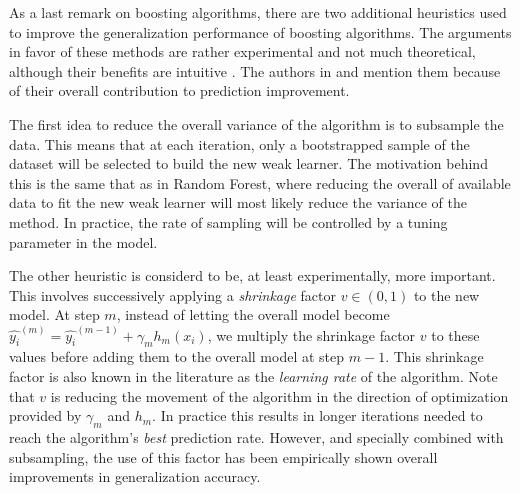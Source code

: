 \documentclass{article}%
\theoremstyle{definition}
\begin{document}
As a last remark on boosting algorithms, there are two additional heuristics used to improve the generalization performance of boosting algorithms. The arguments in favor of these methods are rather experimental and not much theoretical, although their benefits are intuitive . The authors in \cite{hastie-elemstatslearn} and \cite{bishop - patternRecognition} mention them because of their overall contribution to prediction improvement.

The first idea to reduce the overall variance of the algorithm is to subsample the data. This means that at each iteration, only a bootstrapped sample of the dataset will be selected to build the new weak learner. The motivation behind this is the same that as in Random Forest, where reducing the overall of available data to fit the new weak learner will most likely reduce the variance of the method. In practice, the rate of sampling will be controlled by a tuning parameter in the model.

The other heuristic is considerd to be, at least experimentally, more important. This involves successively applying a \textit{shrinkage} factor $v \in  (0,1)$ to the new model.  At step $m$, instead of letting the overall model become $ \hat{y_i}^{(m)} = \hat{y_i}^{(m-1)} +  \gamma_m h_m(x_i) $, we multiply the shrinkage factor $v$ to these values before adding them to the overall model at step $m-1$. This shrinkage factor is also known in the literature as the \textit{learning rate} of the algorithm.  Note that $v$  is reducing the movement of the algorithm in the direction of optimization provided by $\gamma_m$ and $h_m$. In practice this results in longer iterations needed to reach the algorithm's \textit{best} prediction rate. However, and specially combined with subsampling, the use of this factor has been empirically shown overall improvements in generalization accuracy.
\end{document}

